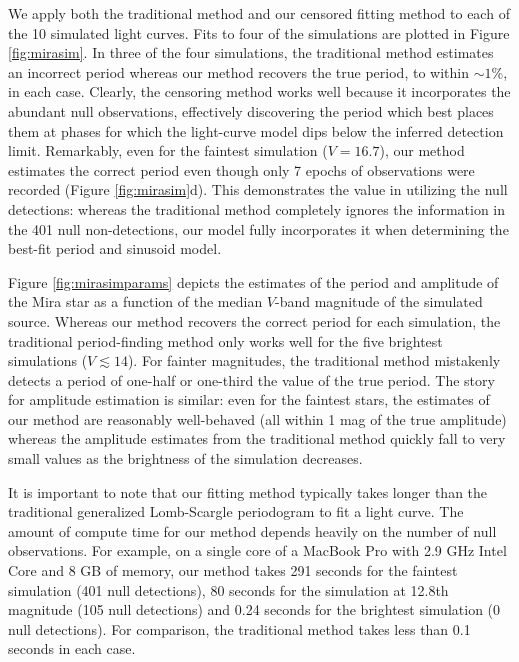 \documentclass[12pt,preprint]{aastex}
\begin{document}
We apply both the traditional method and our censored fitting method to each of the 10 simulated light curves.  Fits to four of the simulations are plotted in Figure \ref{fig:mirasim}.  In three of the four simulations, the traditional method estimates an incorrect period whereas our method recovers the true period, to within $\sim1 \%$, in each case.  Clearly, the censoring method works well because it incorporates the abundant null observations, effectively discovering the period which best places them  at phases for which the light-curve model dips below the inferred detection limit.  Remarkably, even for the faintest simulation ($V=16.7$), our method estimates the correct period even though only 7 epochs of observations were recorded (Figure \ref{fig:mirasim}d).  This demonstrates the value in utilizing the null detections: whereas the traditional method completely ignores the information in the 401 null non-detections, our model fully incorporates it when determining the best-fit period and sinusoid model.

Figure \ref{fig:mirasimparams} depicts the estimates of the period and amplitude of the Mira star as a function of the median $V$-band magnitude of the simulated source.  Whereas our method recovers the correct period for each simulation, the traditional period-finding method only works well for the five brightest simulations ($V \lesssim 14$).  For fainter magnitudes, the traditional method mistakenly detects a period of one-half or one-third the value of the true period.  The story for amplitude estimation is similar: even for the faintest stars, the estimates of our method are reasonably well-behaved (all within 1 mag of the true amplitude) whereas the amplitude estimates from the traditional method quickly fall to very small values as the brightness of the simulation decreases.

  It is important to note that our fitting method typically takes longer than the traditional generalized Lomb-Scargle periodogram to fit a light curve.  The amount of compute time for our method depends heavily on the number of null observations.  For example, on a single core of a MacBook Pro with 2.9 GHz Intel Core and 8 GB of memory, our method takes 291 seconds for the faintest simulation (401 null detections), 80 seconds for the simulation at 12.8th magnitude (105 null detections) and 0.24 seconds for the brightest simulation (0 null detections).  For comparison, the traditional method takes less than 0.1 seconds in each case.
\end{document}
